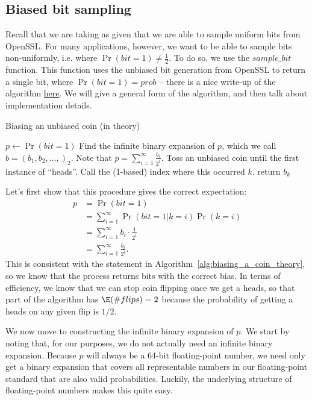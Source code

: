 \documentclass[11pt]{scrartcl} %
\begin{document}
\subsection{Biased bit sampling}
Recall that we are taking as given that we are able to sample uniform bits from OpenSSL.
For many applications, however, we want to be able to sample bits non-uniformly,
i.e. where $\Pr(bit = 1) \neq \frac{1}{2}$. To do so, we use the $sample\_bit$ function.
This function uses the unbiased bit generation from OpenSSL to return a single bit, where $\Pr(bit = 1) = prob$ --
there is a nice write-up of the algorithm \href{https://amakelov.wordpress.com/2013/10/10/arbitrarily-biasing-a-coin-in-2-expected-tosses/}{here}.
We will give a general form of the algorithm, and then talk about implementation details.
\begin{algorithm}[H]
	\caption{Biasing an unbiased coin (in theory)}
	\label{alg:biasing_a_coin_theory}
	\begin{algorithmic}[1]
		\State $p \gets \Pr(bit = 1)$
		\State Find the infinite binary expansion of $p$, which we call $b = (b_1, b_2, \hdots,)_2$.
		Note that $p = \sum_{i=1}^{\infty}\frac{b_i}{2^i}$.
		\State Toss an unbiased coin until the first instance of ``heads''. Call the (1-based) index where this occurred $k$.
		\State return $b_k$
	\end{algorithmic}
\end{algorithm}
Let's first show that this procedure gives the correct expectation:
\begin{align*}
	p &= \Pr(bit = 1) \\
		 &= \sum_{i=1}^{\infty} \Pr(bit = 1 \vert k = i) \Pr(k = i) \\
		 &= \sum_{i=1}^{\infty} b_i \cdot \frac{1}{2^i} \\
		 &= \sum_{i=1}^{\infty}\frac{b_i}{2^i}.
\end{align*}
This is consistent with the statement in Algorithm~\ref{alg:biasing_a_coin_theory}, so we know that
the process returns bits with the correct bias.
In terms of efficiency, we know that we can stop coin flipping once we get a heads,
so that part of the algorithm has $\E(\# flips) = 2$ because the probability of getting a heads 
on any given flip is $1/2$. \newline

We now move to constructing the infinite binary expansion of $p$.
We start by noting that, for our purposes, we do not actually need an infinite binary expansion.
Because $p$ will always be a 64-bit floating-point number, we need only get a binary
expansion that covers all representable numbers in our floating-point standard that are
also valid probabilities.
Luckily, the underlying structure of floating-point numbers makes this quite easy. \newline
\end{document}

